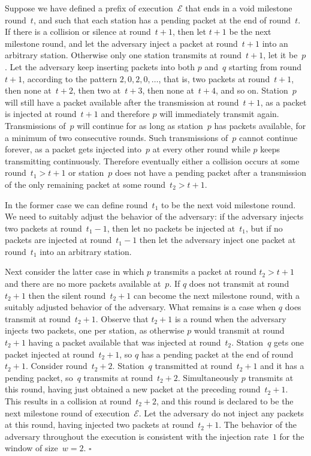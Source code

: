 \documentclass[11pt]{article}
\newcommand{\cE}{\mathcal{E}}
\newcommand{\qed}{\hfill $\square$ \smallbreak}
\newenvironment{proof}{\noindent{\bf Proof:}}{\qed}
\begin{document}
\begin{proof}
Suppose we have defined a prefix of execution~$\cE$ that ends in a void milestone round~$t$, and such that each station has a pending packet at the end of round~$t$.
If there is a collision or silence at round~$t+1$, then let $t+1$ be the next milestone round, and let the adversary inject a packet at round~$t+1$ into an arbitrary station.
Otherwise only one station transmits at round~$t+1$, let it be~$p$.
Let the adversary keep inserting packets into both $p$ and~$q$ starting from round~$t+1$, according to the pattern $2,0,2,0,\ldots$, that is, two packets at round~$t+1$, then none at~$t+2$, then two at~$t+3$, then none at~$t+4$, and so on.
Station~$p$ will still have a packet available after the transmission at round~$t+1$, as a packet is injected at round~$t+1$ and therefore $p$ will immediately transmit again.
Transmissions of~$p$ will continue for as long as station~$p$ has packets available, for a minimum of two consecutive rounds.
Such transmissions of~$p$ cannot continue forever, as a packet gets injected into~$p$ at every other round while $p$ keeps transmitting continuously.
Therefore eventually either a collision occurs at some round~$t_1 > t+1$ or station~$p$ does not have a pending packet after a transmission of the only remaining packet at some round~$t_2>t+1$.

In the former case we can define round~$t_1$ to be the next void milestone round.
We need to suitably adjust the behavior of the adversary: if the adversary injects two packets at round~$t_1-1$, then let no packets be injected at~$t_1$, but if no packets are injected at round~$t_1-1$ then let the adversary inject one packet at round~$t_1$ into an arbitrary station.

Next consider the latter case in which $p$ transmits a packet at round $t_2>t+1$ and there are no more packets available at~$p$.
If $q$ does not transmit at round~$t_2+1$ then the silent round~$t_2+1$ can become the next milestone round, with a suitably adjusted behavior of the adversary.
What remains is a case when $q$ does transmit at round~$t_2+1$.
Observe that $t_2+1$ is a round when the adversary injects two packets, one per station, as otherwise $p$ would transmit at round~$t_2+1$ having a packet available that was injected at round~$t_2$.
Station~$q$ gets one packet injected at round~$t_2+1$, so $q$ has a pending packet at the end of round~$t_2+1$.
Consider round~$t_2+2$.
Station~$q$ transmitted at round~$t_2+1$ and it has a pending packet, so~$q$ transmits at round~$t_2+2$.
Simultaneously $p$ transmits at this round, having just obtained a new packet at the preceding round~$t_2+1$.
This results in a collision at round~$t_2+2$, and this round is declared to be the next milestone round of execution~$\cE$.
Let the adversary do not inject any packets at this round, having injected two packets at round~$t_2+1$.
The behavior of the adversary throughout the execution is consistent with the injection rate~$1$ for the window of size~$w=2$.
\end{proof}
\end{document}
